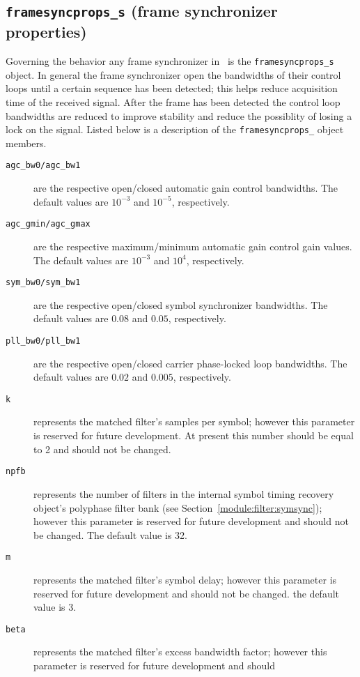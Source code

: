 \subsection{{\tt framesyncprops\_s} (frame synchronizer properties)}
\label{module:framing:framesyncprops_s}
Governing the behavior any frame synchronizer in \liquid\ is the
{\tt framesyncprops\_s} object.
In general the frame synchronizer open the bandwidths of their control
loops until a certain sequence has been detected;
this helps reduce acquisition time of the received signal.
After the frame has been detected the control loop bandwidths are
reduced to improve stability and reduce the possiblity of losing a lock
on the signal.
Listed below is a description of the {\tt framesyncprops\_} object
members.
%
\begin{description}
\item[{\tt agc\_bw0/agc\_bw1}]
    are the respective open/closed automatic gain control bandwidths.
    The default values are $10^{-3}$ and $10^{-5}$, respectively.
\item[{\tt agc\_gmin/agc\_gmax}]
    are the respective maximum/minimum automatic gain control gain values.
    The default values are $10^{-3}$ and $10^{4}$, respectively.
\item[{\tt sym\_bw0/sym\_bw1}]
    are the respective open/closed symbol synchronizer bandwidths.
    The default values are $0.08$ and $0.05$, respectively.
\item[{\tt pll\_bw0/pll\_bw1}]
    are the respective open/closed carrier phase-locked loop bandwidths.
    The default values are $0.02$ and $0.005$, respectively.
\item[{\tt k}]
    represents the matched filter's samples per symbol;
    however this parameter is reserved for future development.
    At present this number should be equal to 2 and should not be
    changed.
\item[{\tt npfb}]
    represents the number of filters in the internal symbol timing
    recovery object's polyphase filter bank
    (see Section~\ref{module:filter:symsync});
    however this parameter is reserved for future development and should
    not be changed.
    The default value is 32.
\item[{\tt m}]
    represents the matched filter's symbol delay;
    however this parameter is reserved for future development and should
    not be changed.
    the default value is 3.
\item[{\tt beta}]
    represents the matched filter's excess bandwidth factor;
    however this parameter is reserved for future development and should

\end{description}
